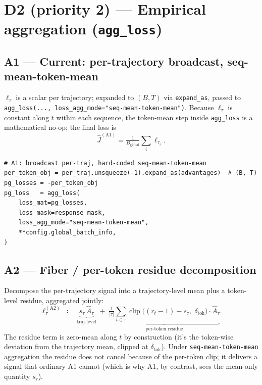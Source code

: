 \documentclass[11pt]{article}
\DeclareMathOperator*{\clip}{clip}
\begin{document}
\section{D2 (priority 2) --- Empirical aggregation (\texttt{agg\_loss})}
\label{sec:d2}

\subsection{A1 --- Current: per-trajectory broadcast, seq-mean-token-mean}

$\ell_\tau$ is a scalar per trajectory; expanded to $(B,T)$ via
\verb|expand_as|, passed to
\verb|agg_loss(..., loss_agg_mode="seq-mean-token-mean")|. Because
$\ell_\tau$ is constant along $t$ within each sequence, the token-mean
step inside \texttt{agg\_loss} is a mathematical no-op; the final loss
is
\[
\hat J^{(\text{A1})} = \tfrac{1}{B_{\text{global}}}\sum_i \ell_{\tau_i}.
\]

\begin{lstlisting}
# A1: broadcast per-traj, hard-coded seq-mean-token-mean
per_token_obj = per_traj.unsqueeze(-1).expand_as(advantages)  # (B, T)
pg_losses = -per_token_obj
pg_loss   = agg_loss(
    loss_mat=pg_losses,
    loss_mask=response_mask,
    loss_agg_mode="seq-mean-token-mean",
    **config.global_batch_info,
)
\end{lstlisting}

\subsection{A2 --- Fiber / per-token residue decomposition}

Decompose the per-trajectory signal into a trajectory-level mean plus a
token-level residue, aggregated jointly:
\[
\ell_\tau^{(\text{A2})}
\;\coloneqq\;
\underbrace{s_\tau\,\hat A_\tau}_{\text{traj-level}}
\;+\;
\underbrace{\tfrac{1}{|\tau|}\sum_{t\in\tau}\clip\!\bigl((r_t-1) - s_\tau,\;\delta_{\text{tok}}\bigr)\cdot\hat A_\tau}_{\text{per-token residue}}.
\]
The residue term is zero-mean along $t$ by construction (it's the
token-wise deviation from the trajectory mean, clipped at
$\delta_{\text{tok}}$). Under \texttt{seq-mean-token-mean} aggregation
the residue does not cancel because of the per-token clip; it delivers
a signal that ordinary A1 cannot (which is why A1, by contrast, sees
the mean-only quantity $s_\tau$).
\end{document}
